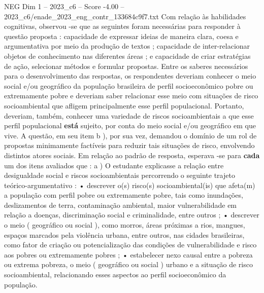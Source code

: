 \begin{textsample}{NEG Dim 1 – 2023\_c6 – Score -4.00 – 2023\_c6/enade\_2023\_eng\_contr\_133684c9f7.txt}
Com relação às habilidades cognitivas, observou -se que as seguintes foram necessárias para responder à questão proposta : capacidade de expressar ideias de maneira clara, coesa e argumentativa por meio da produção de textos ; capacidade de inter-relacionar objetos de conhecimento nas diferentes áreas ; e capacidade de criar estratégias de ação, selecionar métodos e formular propostas.
Entre os saberes necessários para o desenvolvimento das respostas, os respondentes deveriam conhecer o meio social e/ou geográfico da população brasileira de perfil socioeconômico pobre ou extremamente pobre e deveriam saber relacionar esse meio com situações de risco socioambiental que afligem principalmente esse perfil populacional.
Portanto, deveriam, também, conhecer uma variedade de riscos socioambientais a que esse perfil populacional \textbf{está} sujeito, por conta do meio social e/ou geográfico em que vive.
A questão, em seu item b ), por sua vez, demandou o domínio de um rol de propostas minimamente factíveis para reduzir tais situações de risco, envolvendo distintos atores sociais.
Em relação ao padrão de resposta, esperava -se para \textbf{cada} um dos itens avaliados que : a ) O estudante explicasse a relação entre desigualdade social e riscos socioambientais percorrendo o seguinte trajeto teórico-argumentativo : • descrever o(s) risco(s) socioambiental(is) que afeta(m) a população com perfil pobre ou extremamente pobre, tais como inundações, deslizamentos de terra, contaminação ambiental, maior vulnerabilidade em relação a doenças, discriminação social e criminalidade, entre outros ; • descrever o meio ( geográfico ou social ), como morros, áreas próximas a rios, mangues, espaços marcados pela violência urbana, entre outros, nas cidades brasileiras, como fator de criação ou potencialização das condições de vulnerabilidade e risco aos pobres ou extremamente pobres ; • estabelecer nexo causal entre a pobreza ou extrema pobreza, o meio ( geográfico ou social ) urbano e a situação de risco socioambiental, relacionando esses aspectos ao perfil socioeconômico da população.

\end{textsample}
